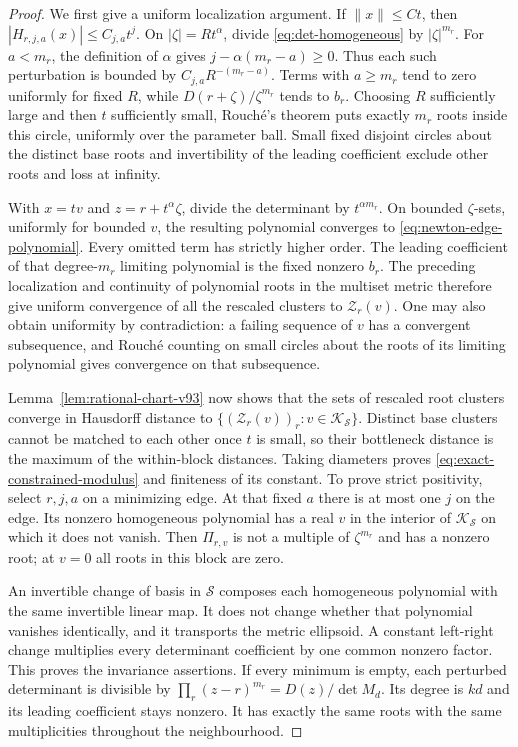 \begin{proof}
We first give a uniform localization argument. If $\|x\|\le Ct$,
then $|H_{r,j,a}(x)|\le C_{j,a}t^j$. On
$|\zeta|=R t^\alpha$, divide \eqref{eq:det-homogeneous} by
$|\zeta|^{m_r}$. For $a<m_r$, the definition of $\alpha$ gives
$j-\alpha(m_r-a)\ge0$. Thus each such perturbation is bounded by
$C_{j,a}R^{-(m_r-a)}$. Terms with $a\ge m_r$ tend to zero uniformly
for fixed $R$, while $D(r+\zeta)/\zeta^{m_r}$ tends to $b_r$.
Choosing $R$ sufficiently large and then $t$ sufficiently small,
Rouch\'e's theorem puts exactly $m_r$ roots inside this circle,
uniformly over the parameter ball. Small fixed disjoint circles
about the distinct base roots and invertibility of the leading
coefficient exclude other roots and loss at infinity.

With $x=tv$ and $z=r+t^\alpha\zeta$, divide the determinant by
$t^{\alpha m_r}$. On bounded $\zeta$-sets, uniformly for bounded $v$,
the resulting polynomial converges to \eqref{eq:newton-edge-polynomial}.
Every omitted term has strictly higher order. The leading coefficient
of that degree-$m_r$ limiting polynomial is the fixed nonzero $b_r$.
The preceding localization and continuity of polynomial roots in the
multiset metric therefore give uniform convergence of all the
rescaled clusters to $\mathcal Z_r(v)$. One may also obtain uniformity
by contradiction: a failing sequence of $v$ has a convergent
subsequence, and Rouch\'e counting on small circles about the roots
of its limiting polynomial gives convergence on that subsequence.

Lemma~\ref{lem:rational-chart-v93} now shows that the sets of rescaled
root clusters converge in Hausdorff distance to
$\{(\mathcal Z_r(v))_r:v\in\mathcal K_{\mathcal S}\}$.
Distinct base clusters cannot be matched to each other once $t$ is
small, so their bottleneck distance is the maximum of the within-block
distances. Taking diameters proves \eqref{eq:exact-constrained-modulus}
and finiteness of its constant. To prove strict positivity, select
$r,j,a$ on a minimizing edge. At that fixed $a$ there is at most one
$j$ on the edge. Its nonzero homogeneous polynomial has a real
$v$ in the interior of $\mathcal K_{\mathcal S}$ on which it does not
vanish. Then $\Pi_{r,v}$ is not a multiple of $\zeta^{m_r}$ and
has a nonzero root; at $v=0$ all roots in this block are zero.

An invertible change of basis in $\mathcal S$ composes each
homogeneous polynomial with the same invertible linear map. It does
not change whether that polynomial vanishes identically, and it
transports the metric ellipsoid. A constant left-right change
multiplies every determinant coefficient by one common nonzero
factor. This proves the invariance assertions. If every minimum is
empty, each perturbed determinant is divisible by
$\prod_r(z-r)^{m_r}=D(z)/\det M_d$. Its degree is $kd$ and its
leading coefficient stays nonzero. It has exactly the same roots
with the same multiplicities throughout the neighbourhood.
\end{proof}

